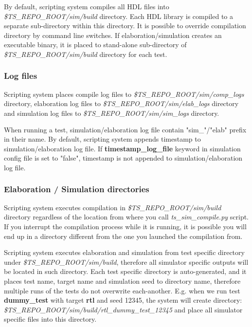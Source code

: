 \documentclass{tropic_design_spec}
\begin{document}
By default, scripting system compiles all HDL files into \textit{\$TS_REPO_ROOT/sim/build}
directory. Each HDL library is compiled to a separate sub-directory within this directory.
It is possible to override compilation directory by command line switches. If
elaboration/simulation creates an executable binary, it is placed to stand-alone
sub-directory of \textit{\$TS_REPO_ROOT/sim/build} directory for each test.


\subsubsection{Log files}
\label{sec:log-files}

Scripting system places compile log files to \textit{\$TS_REPO_ROOT/sim/comp_logs}
directory, elaboration log files to \textit{\$TS_REPO_ROOT/sim/elab_logs} directory
and simulation log files to \textit{\$TS_REPO_ROOT/sim/sim_logs} directory.

When running a test, simulation/elaboration log file contain "sim_"/"elab" prefix in
their name. By default, scripting system appends timestamp to simulation/elaboration
log file. If \textbf{timestamp_log_file} keyword in simulation config file is set to
"false", timestamp is not appended to simulation/elaboration log file.


\subsubsection{Elaboration / Simulation directories}
\label{sec:elaboration-simulation-directories}

Scripting system executes compilation in \textit{\$TS_REPO_ROOT/sim/build} directory
regardless of the location from where you call \textit{ts_sim_compile.py} script. If you
interrupt the compilation process while it is running, it is possible you will end up in
a directory different from the one you launched the compilation from.

Scripting system executes elaboration and simulation from test specific directory under
\textit{\$TS_REPO_ROOT/sim/build}, therefore all simulator specific outputs will be
located in such directory. Each test specific directory is auto-generated, and it
places test name, target name and simulation seed to directory name,
therefore multiple runs of the tests do not overwrite each-another. E.g. when we
run test \textbf{dummy_test} with target \textbf{rtl} and seed 12345, the system will
create directory: \textit{\$TS_REPO_ROOT/sim/build/rtl_dummy_test_12345} and place
all simulator specific files into this directory.
\end{document}
